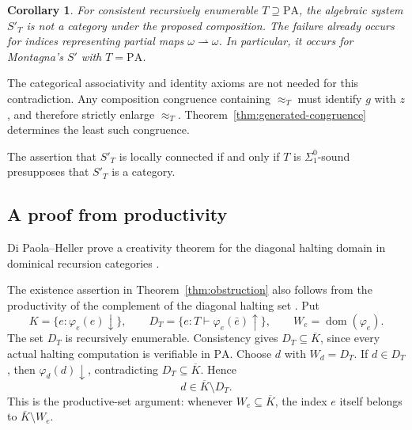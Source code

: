 \documentclass[11pt]{article}
\newtheorem{corollary}[theorem]{Corollary}
\newcommand{\PA}{\mathrm{PA}}
\begin{document}
\begin{corollary}\label{cor:not-category}
For consistent recursively enumerable $T\supseteq\PA$, the algebraic
system $S'_T$ is not a category under the proposed composition.
The failure already occurs for indices representing partial maps
$\omega\rightharpoonup\omega$. In particular, it occurs for
Montagna's $S'$ with $T=\PA$.
\end{corollary}

The categorical associativity and identity axioms are not needed for
this contradiction.
Any composition congruence containing $\approx_T$ must identify $g$
with $z$, and therefore strictly enlarge $\approx_T$.
Theorem~\ref{thm:generated-congruence} determines the least such congruence.

The assertion that $S'_T$ is locally connected if and only if $T$
is $\Sigma^0_1$-sound \cite[Theorem~4.5, pp.~658--659]{DiPaolaMontagna}
presupposes that $S'_T$ is a category.

\subsection{A proof from productivity}\label{sec:productive}

Di Paola--Heller prove a creativity theorem for the diagonal halting
domain in dominical recursion categories
\cite[Theorem~8.5, pp.~622--623]{DiPaolaHeller}.

The existence assertion in Theorem~\ref{thm:obstruction} also follows
from the productivity of the complement of the diagonal halting set
\cite[Section~5.3, p.~136]{GallierQuaintance}.
Put
\[
 K=\{e:\varphi_e(e)\downarrow\},\qquad
 D_T=\{e:T\vdash\varphi_e(\bar e)\uparrow\},
 \qquad W_e=\operatorname{dom}(\varphi_e).
\]
The set $D_T$ is recursively enumerable. Consistency gives
$D_T\subseteq\overline K$, since every actual halting computation is
verifiable in $\PA$. Choose $d$ with $W_d=D_T$.
If $d\in D_T$, then $\varphi_d(d)\downarrow$, contradicting
$D_T\subseteq\overline K$. Hence
\[
 d\in\overline K\setminus D_T.
\]
This is the productive-set argument: whenever $W_e\subseteq\overline K$,
the index $e$ itself belongs to $\overline K\setminus W_e$.
\end{document}

